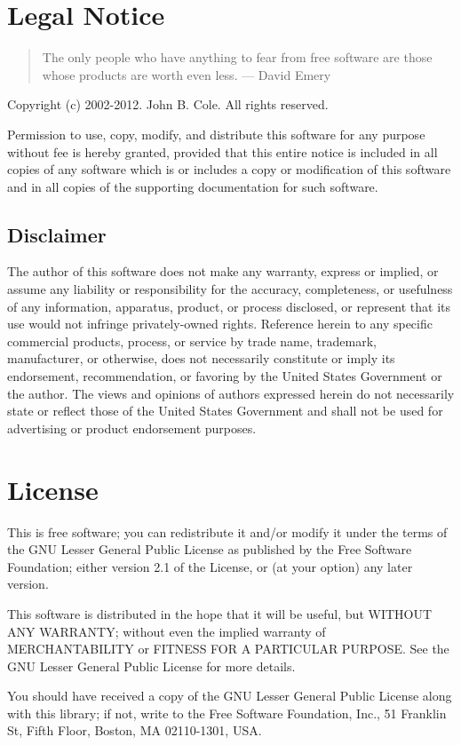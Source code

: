 \section*{Legal Notice}
\begin{quote}
 The only people who have anything to fear from free software are those whose products are worth even less. --- David Emery
\end{quote}

\label{sec:legal-notice}
Copyright (c) 2002-2012.  John B. Cole.  All rights reserved.

Permission to use, copy, modify, and distribute this software for any purpose
without fee is hereby granted, provided that this entire notice is included in
all copies of any software which is or includes a copy or modification of this
software and in all copies of the supporting documentation for such software.

\subsection*{Disclaimer}
The author of this software does not make any warranty, express or implied, or
assume any liability or responsibility for the accuracy, completeness, or
usefulness of any information, apparatus, product, or process disclosed, or
represent that its use would not infringe privately-owned rights. Reference
herein to any specific commercial products, process, or service by trade name,
trademark, manufacturer, or otherwise, does not necessarily constitute or imply
its endorsement, recommendation, or favoring by the United States Government or
the author. The views and opinions of authors expressed herein do not necessarily
state or reflect those of the United States Government and shall not be used for
advertising or product endorsement purposes.

\section*{License}\label{sec:license}
This is free software; you can redistribute it and/or modify it
under the terms of the GNU Lesser General Public License as published by
the Free Software Foundation; either version 2.1 of the License, or (at
your option) any later version.

This software is distributed in the hope that it will be useful, but
WITHOUT ANY WARRANTY; without even the implied warranty of
MERCHANTABILITY or FITNESS FOR A PARTICULAR PURPOSE.  See the GNU
Lesser General Public License for more details.

You should have received a copy of the GNU Lesser General Public
License along with this library; if not, write to the Free Software
Foundation, Inc., 51 Franklin St, Fifth Floor, Boston, MA 02110-1301,
USA.